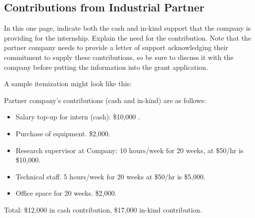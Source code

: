 \documentclass[12pt]{article}
\begin{document}
\setcounter{page}{5}
\subsection*{Contributions from Industrial Partner}

In this one page, indicate both the cash and in-kind support that the company is providing for the internship. Explain the need for the contribution. Note that the partner company needs to provide a letter of support acknowledging their commitment to supply these contributions, so be sure to discuss it with the company before putting the information into the grant application. 

A sample itemization might look like this:

\vskip 3mm \noindent
Partner company's contributions (cash and in-kind) are as follows:
\begin{itemize}
\item Salary top-up for intern (cash): \$10,000 .
\item Purchase of equipment. \$2,000.
\item Research supervisor at Company:  10 hours/week for 20 weeks, at \$50/hr is \$10,000.
\item Technical staff. 5 hours/week for 20 weeks at \$50/hr is \$5,000.
\item Office space for 20 weeks. \$2,000.
\end{itemize}

Total: \$12,000 in cash contribution, \$17,000 in-kind contribution.

\vskip 3mm

 
\end{document}
